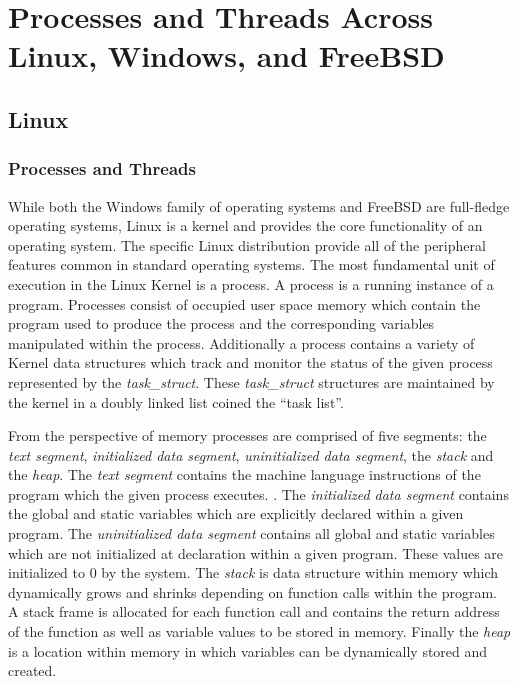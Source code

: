 
\section{ \bf Processes and Threads Across Linux, Windows, and FreeBSD}
\subsection{\bf Linux}
  \subsubsection{\bf Processes and Threads}
    \normalfont \indent While both the Windows family of operating systems and FreeBSD are full-fledge operating systems, Linux is a kernel and provides the core functionality of an operating system. The specific Linux distribution provide all of the peripheral features common in standard operating systems. The most fundamental unit of execution in the Linux Kernel is a process. A process is a running instance of a program. Processes consist of occupied user space memory which contain the program used to produce the process and the corresponding variables manipulated within the process. Additionally a process contains a variety of Kernel data structures which track and monitor the status of the given process represented by the \textit{task\_struct}. These \textit{task\_struct} structures are maintained by the kernel in a doubly linked list coined the “task list”.

    \normalfont \indent From the perspective of memory processes are comprised of five segments: the \textit{text segment}, \textit{initialized data segment}, \textit{uninitialized data segment}, the \textit{stack} and the \textit{heap}. The \textit{text segment} contains the machine language instructions of the program which the given process executes. \cite{linuxProgInterface2010}. The \textit{initialized data segment} contains the global and static variables which are explicitly declared within a given program. The \textit{uninitialized data segment} contains all global and static variables which are not initialized at declaration within a given program. These values are initialized to 0 by the system. The \textit{stack} is data structure within memory which dynamically grows and shrinks depending on function calls within the program. A stack frame is allocated for each function call and contains the return address of the function as well as variable values to be stored in memory. Finally the \textit{heap} is a location within memory in which variables can be dynamically stored and created.

